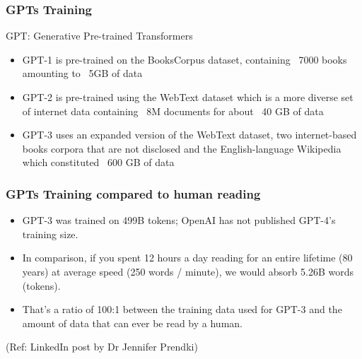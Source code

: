 
\begin{frame}[fragile]\frametitle{GPTs Training}

GPT: Generative Pre-trained Transformers

\begin{itemize}
\item GPT-1 is pre-trained on the BooksCorpus dataset, containing ~7000 books amounting to ~5GB of data
\item GPT-2 is pre-trained using the WebText dataset which is a more diverse set of internet data containing ~8M documents for about ~40 GB of data
\item GPT-3 uses an expanded version of the WebText dataset, two internet-based books corpora that are not disclosed and the English-language Wikipedia which constituted ~600 GB of data
\end{itemize}	 

\end{frame}

\begin{frame}[fragile]\frametitle{GPTs Training compared to human reading}

\begin{itemize}
\item GPT-3 was trained on 499B tokens; OpenAI has not published GPT-4's training size.
\item In comparison, if you spent 12 hours a day reading for an entire lifetime (80 years) at average speed (250 words / minute), we would absorb 5.26B words (tokens).
\item That's a ratio of 100:1 between the training data used for GPT-3 and the amount of data that can ever be read by a human.
\end{itemize}	 

\tiny{(Ref: LinkedIn post by Dr Jennifer Prendki)}

\end{frame}


